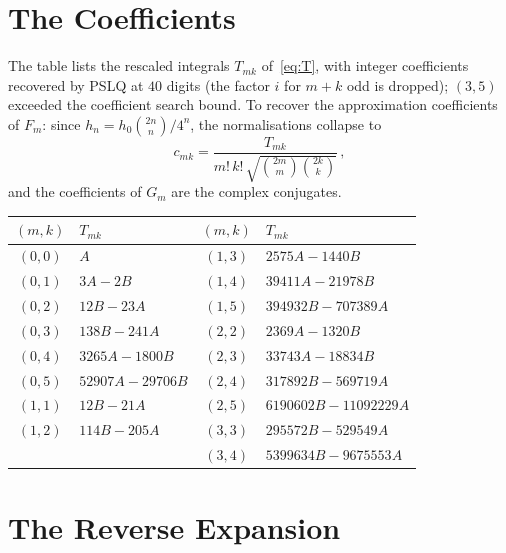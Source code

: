 \documentclass[11pt,a4paper]{article}
\begin{document}
\section{The Coefficients}

The table lists the rescaled integrals $T_{mk}$ of~\eqref{eq:T}, with
integer coefficients recovered by PSLQ at $40$ digits (the factor $i$
for $m+k$ odd is dropped); $(3,5)$ exceeded the coefficient search
bound. To recover the approximation coefficients of $F_m$: since
$h_n = h_0 \binom{2n}{n}/4^n$, the normalisations collapse to
\[
  c_{mk}
  = \frac{T_{mk}}{m!\, k!\,
    \sqrt{\binom{2m}{m}\binom{2k}{k}}}\,,
\]
and the coefficients of $G_m$ are the complex conjugates.

\begin{table}[ht]
\centering
\small
\begin{tabular}{cl@{\qquad}cl}
\toprule
$(m,k)$ & $T_{mk}$ & $(m,k)$ & $T_{mk}$ \\
\midrule
$(0,0)$ & $A$                   & $(1,3)$ & $2575A - 1440B$ \\
$(0,1)$ & $3A - 2B$             & $(1,4)$ & $39411A - 21978B$ \\
$(0,2)$ & $12B - 23A$           & $(1,5)$ & $394932B - 707389A$ \\
$(0,3)$ & $138B - 241A$         & $(2,2)$ & $2369A - 1320B$ \\
$(0,4)$ & $3265A - 1800B$       & $(2,3)$ & $33743A - 18834B$ \\
$(0,5)$ & $52907A - 29706B$     & $(2,4)$ & $317892B - 569719A$ \\
$(1,1)$ & $12B - 21A$           & $(2,5)$ & $6190602B - 11092229A$ \\
$(1,2)$ & $114B - 205A$         & $(3,3)$ & $295572B - 529549A$ \\
        &                       & $(3,4)$ & $5399634B - 9675553A$ \\
\bottomrule
\end{tabular}
\end{table}

\section{The Reverse Expansion}
\end{document}
